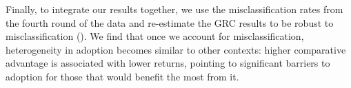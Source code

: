 \documentclass[11pt]{article}
\begin{document}
Finally, to integrate our results together, we use the misclassification rates from the fourth round of the data and re-estimate the GRC results to be robust to misclassification (\citealt{michuda2021three}). We find that once we account for misclassification, heterogeneity in adoption becomes similar to other contexts: higher comparative advantage is associated with lower returns, pointing to significant barriers to adoption for those that would benefit the most from it. 





\end{document}
